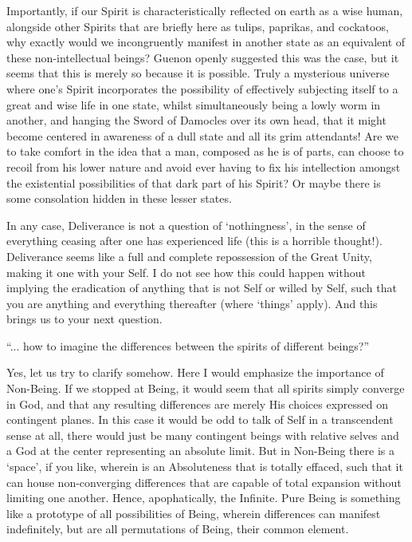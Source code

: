 \begin{footnotesize}
\begin{sffamily}
Importantly, if our Spirit is characteristically reflected on earth as a wise human, alongside other Spirits that are briefly here as tulips, paprikas, and cockatoos, why exactly would we incongruently manifest in another state as an equivalent of these non-intellectual beings? Guenon openly suggested this was the case, but it seems that this is merely so because it is possible. Truly a mysterious universe where one's Spirit incorporates the possibility of effectively subjecting itself to a great and wise life in one state, whilst simultaneously being a lowly worm in another, and hanging the Sword of Damocles over its own head, that it might become centered in awareness of a dull state and all its grim attendants! Are we to take comfort in the idea that a man, composed as he is of parts, can choose to recoil from his lower nature and avoid ever having to fix his intellection amongst the existential possibilities of that dark part of his Spirit? Or maybe there is some consolation hidden in these lesser states.

In any case, Deliverance is not a question of `nothingness', in the sense of everything ceasing after one has experienced life (this is a horrible thought!). Deliverance seems like a full and complete repossession of the Great Unity, making it one with your Self. I do not see how this could happen without implying the eradication of anything that is not Self or willed by Self, such that you are anything and everything thereafter (where `things' apply). And this brings us to your next question.

``... how to imagine the differences between the spirits of different beings?''

Yes, let us try to clarify somehow. Here I would emphasize the importance of Non-Being. If we stopped at Being, it would seem that all spirits simply converge in God, and that any resulting differences are merely His choices expressed on contingent planes. In this case it would be odd to talk of Self in a transcendent sense at all, there would just be many contingent beings with relative selves and a God at the center representing an absolute limit. But in Non-Being there is a `space', if you like, wherein is an Absoluteness that is totally effaced, such that it can house non-converging differences that are capable of total expansion without limiting one another. Hence, apophatically, the Infinite. Pure Being is something like a prototype of all possibilities of Being, wherein differences can manifest indefinitely, but are all permutations of Being, their common element.


\end{sffamily}
\end{footnotesize}
